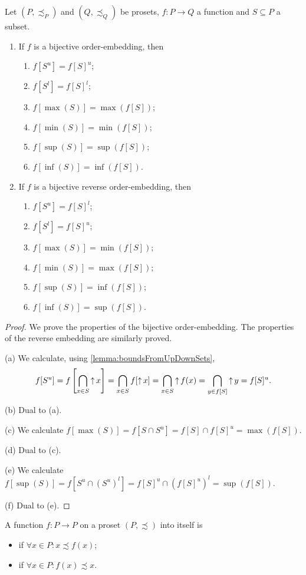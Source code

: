 \begin{corollary} \label{corollary:bijectiveOrderEmbeddingBounds}
Let $(P, \precsim_P)$ and $(Q, \precsim_Q)$ be prosets, $f: P\to Q$ a function and $S\subseteq P$ a subset.
\begin{enumerate}
\item If $f$ is a bijective order-embedding, then
\begin{enumerate}
\item $f[S^u] = f[S]^u$;
\item $f[S^l] = f[S]^l$;
\item $f[\max(S)] = \max(f[S])$;
\item $f[\min(S)] = \min(f[S])$;
\item $f[\sup(S)] = \sup(f[S])$;
\item $f[\inf(S)] = \inf(f[S])$.
\end{enumerate}
\item If $f$ is a bijective reverse order-embedding, then
\begin{enumerate}
\item $f[S^u] = f[S]^l$;
\item $f[S^l] = f[S]^u$;
\item $f[\max(S)] = \min(f[S])$;
\item $f[\min(S)] = \max(f[S])$;
\item $f[\sup(S)] = \inf(f[S])$;
\item $f[\inf(S)] = \sup(f[S])$.
\end{enumerate}
\end{enumerate}
\end{corollary}
\begin{proof}
We prove the properties of the bijective order-embedding. The properties of the reverse embedding are similarly proved.

(a) We calculate, using \ref{lemma:boundsFromUpDownSets},
\[ f[S^u] = f\left[\bigcap_{x\in S}\mathop{\uparrow} x\right] = \bigcap_{x\in S}f[\mathop{\uparrow} x] = \bigcap_{x\in S}\mathop{\uparrow} f(x) = \bigcap_{y\in f[S]}\mathop{\uparrow} y =  f[S]^u. \]

(b) Dual to (a).

(c) We calculate $f[\max(S)] = f[S\cap S^u] = f[S]\cap f[S]^u = \max(f[S])$.

(d) Dual to (c).

(e) We calculate $ f[\sup(S)] = f[S^u\cap (S^u)^l] = f[S]^u \cap (f[S]^u)^l = \sup(f[S])$.

(f) Dual to (e).
\end{proof}


\begin{definition}
A function $f: P\to P$ on a proset $(P,\precsim)$ into itself is
\begin{itemize}
\item {} if $\forall x\in P: x\precsim f(x)$;
\item {} if $\forall x\in P: f(x)\precsim x$.
\end{itemize}
\end{definition}

